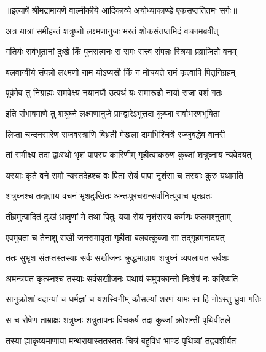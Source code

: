 {॥इत्यार्षे श्रीमद्रामायणे वाल्मीकीये आदिकाव्ये अयोध्याकाण्डे एकसप्ततितमः सर्गः॥}


\twolineshloka
{अत्र यात्रां समीहन्तं शत्रुघ्नो लक्ष्मणानुजः}
{भरतं शोकसंतप्तमिदं वचनमब्रवीत्} %

\twolineshloka
{गतिर्यः सर्वभूतानां दुःखे किं पुनरात्मनः}
{स रामः सत्त्व संपन्नः स्त्रिया प्रव्राजितो वनम्} %

\twolineshloka
{बलवान्वीर्य संपन्नो लक्ष्मणो नाम योऽप्यसौ}
{किं न मोचयते रामं कृत्वापि पितृनिग्रहम्} %

\twolineshloka
{पूर्वमेव तु निग्राह्यः समवेक्ष्य नयानयौ}
{उत्पथं यः समारूढो नार्या राजा वशं गतः} %

\twolineshloka
{इति संभाषमाणे तु शत्रुघ्ने लक्ष्मणानुजे}
{प्राग्द्वारेऽभूत्तदा कुब्जा सर्वाभरणभूषिता} %

\twolineshloka
{लिप्ता चन्दनसारेण राजवस्त्राणि बिभ्रती}
{मेखला दामभिश्चित्रै रज्जुबद्धेव वानरी} %

\twolineshloka
{तां समीक्ष्य तदा द्वाःस्थो भृशं पापस्य कारिणीम्}
{गृहीत्वाकरुणं कुब्जां शत्रुघ्नाय न्यवेदयत्} %

\twolineshloka
{यस्याः कृते वने रामो न्यस्तदेहश्च वः पिता}
{सेयं पापा नृशंसा च तस्याः कुरु यथामति} %

\twolineshloka
{शत्रुघ्नश्च तदाज्ञाय वचनं भृशदुःखितः}
{अन्तःपुरचरान्सर्वानित्युवाच धृतव्रतः} %

\twolineshloka
{तीव्रमुत्पादितं दुःखं भ्रातॄणां मे तथा पितुः}
{यया सेयं नृशंसस्य कर्मणः फलमश्नुताम्} %

\twolineshloka
{एवमुक्ता च तेनाशु सखी जनसमावृता}
{गृहीता बलवत्कुब्जा सा तद्गृहमनादयत्} %

\twolineshloka
{ततः सुभृश संतप्तस्तस्याः सर्वः सखीजनः}
{क्रुद्धमाज्ञाय शत्रुघ्नं व्यपलायत सर्वशः} %

\twolineshloka
{अमन्त्रयत कृत्स्नश्च तस्याः सर्वसखीजनः}
{यथायं समुपक्रान्तो निःशेषं नः करिष्यति} %

\twolineshloka
{सानुक्रोशां वदान्यां च धर्मज्ञां च यशस्विनीम्}
{कौसल्यां शरणं यामः सा हि नोऽस्तु ध्रुवा गतिः} %

\twolineshloka
{स च रोषेण ताम्राक्षः शत्रुघ्नः शत्रुतापनः}
{विचकर्ष तदा कुब्जां क्रोशन्तीं पृथिवीतले} %

\twolineshloka
{तस्या ह्याकृष्यमाणाया मन्थरायास्ततस्ततः}
{चित्रं बहुविधं भाण्डं पृथिव्यां तद्व्यशीर्यत} %

